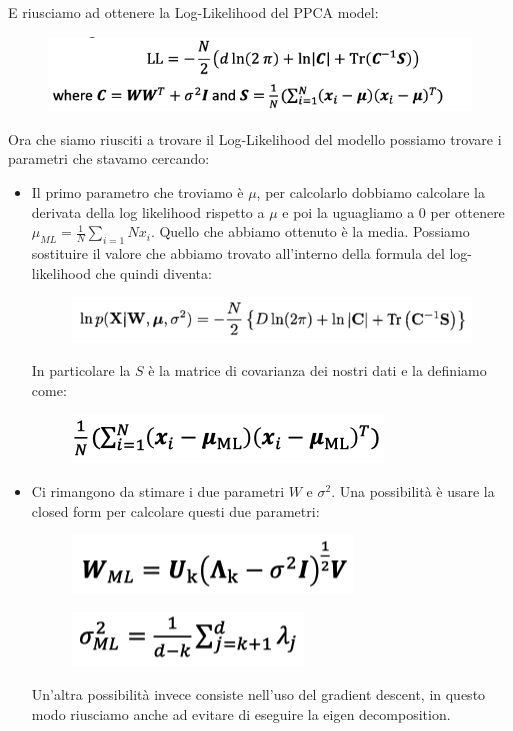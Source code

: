 \documentclass[14pt]{extreport}
\begin{document}
E riusciamo ad ottenere la Log-Likelihood del PPCA model:

\begin{figure}[H] 
	\centering
	\includegraphics[width=0.7\linewidth]{486.jpeg}
	\end{figure}

Ora che siamo riusciti a trovare il Log-Likelihood del modello possiamo trovare i parametri che stavamo cercando:
\begin{itemize}
	\item Il primo parametro che troviamo è $\mu$, per calcolarlo dobbiamo calcolare la derivata della log likelihood rispetto a $\mu$ e poi la 
	uguagliamo a 0 per ottenere $\mu_{ML} = \frac{1}{N}\sum_{i=1}{N}x_i$. Quello che abbiamo ottenuto è la media. Possiamo sostituire il valore che abbiamo 
	trovato all'interno della formula del log-likelihood che quindi diventa:
	\begin{figure}[H] 
	\centering
	\includegraphics[width=0.7\linewidth]{487.jpeg}
	\end{figure}
	In particolare la $S$ è la matrice di covarianza dei nostri dati e la definiamo come:
	\begin{figure}[H] 
	\centering
	\includegraphics[width=0.7\linewidth]{488.jpeg}
	\end{figure}
	\item Ci rimangono da stimare i due parametri $W$ e $\sigma^2$. Una possibilità è usare la closed form per calcolare questi due parametri:
	\begin{figure}[H] 
	\centering
	\includegraphics[width=0.7\linewidth]{493.jpeg}
	\end{figure}
	\begin{figure}[H] 
	\centering
	\includegraphics[width=0.7\linewidth]{492.jpeg}
	\end{figure}
	Un'altra possibilità
	invece consiste nell'uso del gradient descent, in questo modo riusciamo anche ad evitare di eseguire la eigen decomposition.
\end{itemize}
\end{document}
